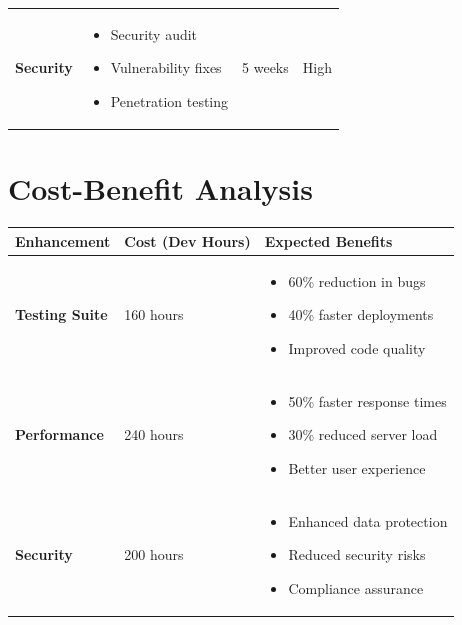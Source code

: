 \begin{tcolorbox}
\begin{center}
\begin{longtable}{>{\bfseries}p{}p{}p{}p{}}
        Security & 
        \begin{itemize}[nosep]
            \item Security audit
            \item Vulnerability fixes
            \item Penetration testing
        \end{itemize} &
        5 weeks &
        \textcolor{danger}{High} \\
    \end{longtable}
    \end{center}
\end{tcolorbox}

\section{Cost-Benefit Analysis}

\begin{tcolorbox}[
    enhanced,
    title={Investment Impact},
    attach boxed title to top left,
    boxed title style={
        colback=success!50,
        colframe=success!50,
        arc=0mm,
    },
    colback=white,
    colframe=success!50,
    arc=0mm,
    fonttitle=\bfseries
]
    \begin{center}
    \begin{tabular}{>{\bfseries}p{}p{}p{}}
        \toprule
        Enhancement & Cost (Dev Hours) & Expected Benefits \\
        \midrule
        Testing Suite & 160 hours & 
        \begin{itemize}[nosep]
            \item 60\% reduction in bugs
            \item 40\% faster deployments
            \item Improved code quality
        \end{itemize} \\
        \midrule
        Performance & 240 hours &
        \begin{itemize}[nosep]
            \item 50\% faster response times
            \item 30\% reduced server load
            \item Better user experience
        \end{itemize} \\
        \midrule
        Security & 200 hours &
        \begin{itemize}[nosep]
            \item Enhanced data protection
            \item Reduced security risks
            \item Compliance assurance
        \end{itemize} \\
        \bottomrule
    \end{tabular}
    \end{center}
\end{tcolorbox}

